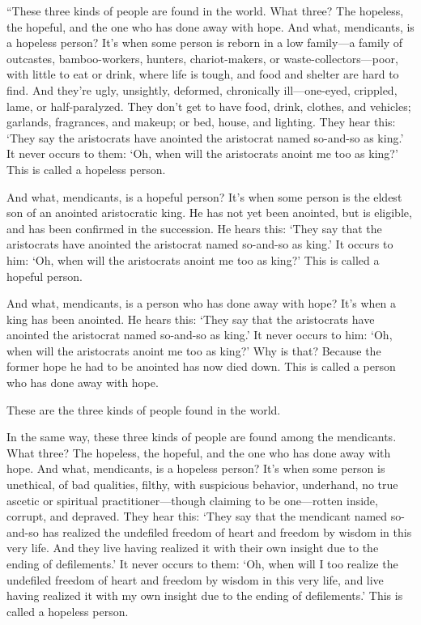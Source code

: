 \documentclass[12pt,openany]{book}%
\begin{document}
“These three kinds of people are found in the world. What three? The hopeless, the hopeful, and the one who has done away with hope. And what, mendicants, is a hopeless person? It’s when some person is reborn in a low family—a family of outcastes, bamboo-workers, hunters, chariot-makers, or waste-collectors—poor, with little to eat or drink, where life is tough, and food and shelter are hard to find. And they’re ugly, unsightly, deformed, chronically ill—one-eyed, crippled, lame, or half-paralyzed. They don’t get to have food, drink, clothes, and vehicles; garlands, fragrances, and makeup; or bed, house, and lighting. They hear this: ‘They say the aristocrats have anointed the aristocrat named so-and-so as king.’ It never occurs to them: ‘Oh, when will the aristocrats anoint me too as king?’ This is called a hopeless person. 

And what, mendicants, is a hopeful person? It’s when some person is the eldest son of an anointed aristocratic king. He has not yet been anointed, but is eligible, and has been confirmed in the succession. He hears this: ‘They say that the aristocrats have anointed the aristocrat named so-and-so as king.’ It occurs to him: ‘Oh, when will the aristocrats anoint me too as king?’ This is called a hopeful person. 

And what, mendicants, is a person who has done away with hope? It’s when a king has been anointed. He hears this: ‘They say that the aristocrats have anointed the aristocrat named so-and-so as king.’ It never occurs to him: ‘Oh, when will the aristocrats anoint me too as king?’ Why is that? Because the former hope he had to be anointed has now died down. This is called a person who has done away with hope. 

These are the three kinds of people found in the world. 

In the same way, these three kinds of people are found among the mendicants. What three? The hopeless, the hopeful, and the one who has done away with hope. And what, mendicants, is a hopeless person? It’s when some person is unethical, of bad qualities, filthy, with suspicious behavior, underhand, no true ascetic or spiritual practitioner—though claiming to be one—rotten inside, corrupt, and depraved. They hear this: ‘They say that the mendicant named so-and-so has realized the undefiled freedom of heart and freedom by wisdom in this very life. And they live having realized it with their own insight due to the ending of defilements.’ It never occurs to them: ‘Oh, when will I too realize the undefiled freedom of heart and freedom by wisdom in this very life, and live having realized it with my own insight due to the ending of defilements.’ This is called a hopeless person. 
\end{document}
